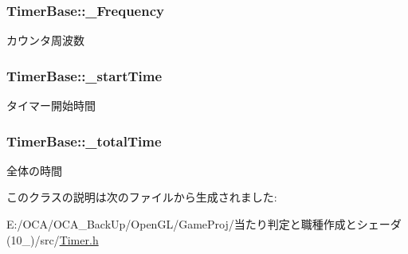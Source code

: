 \hypertarget{class_timer_base_a1c838e0a5acc12a808a472128f6281fd}{
\subsubsection[{\-\_\-\-Frequency}]{ Timer\-Base\-::\-\_\-\-Frequency\hspace{0.3cm}{\ttfamily [protected]}}}\label{class_timer_base_a1c838e0a5acc12a808a472128f6281fd}


カウンタ周波数 

\hypertarget{class_timer_base_ae8e31c0cc54cbe908508dbc165618fbc}{
\subsubsection[{\-\_\-start\-Time}]{ Timer\-Base\-::\-\_\-start\-Time\hspace{0.3cm}{\ttfamily [protected]}}}\label{class_timer_base_ae8e31c0cc54cbe908508dbc165618fbc}


タイマー開始時間 

\hypertarget{class_timer_base_a3eaed58a0aa86c23b4dafb460b86d2bf}{
\subsubsection[{\-\_\-total\-Time}]{ Timer\-Base\-::\-\_\-total\-Time\hspace{0.3cm}{\ttfamily [protected]}}}\label{class_timer_base_a3eaed58a0aa86c23b4dafb460b86d2bf}


全体の時間 



このクラスの説明は次のファイルから生成されました\-:\begin{DoxyCompactItemize}
\item 
E\-:/\-O\-C\-A/\-O\-C\-A\-\_\-\-Back\-Up/\-Open\-G\-L/\-Game\-Proj/当たり判定と職種作成とシェーダ(10\-\_)/src/\hyperlink{_timer_8h}{Timer.\-h}\end{DoxyCompactItemize}
